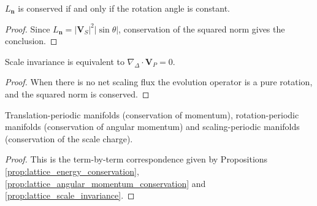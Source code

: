 \begin{proposition}\label{prop:lattice_angular_momentum_conservation}
$L_{\mathbf{n}}$ is conserved if and only if the rotation angle is constant.
\end{proposition}

\begin{proof}
Since $L_{\mathbf{n}}=|\mathbf{V}_S|^2|\sin\theta|$, conservation of the squared norm gives the conclusion.
\end{proof}

\begin{proposition}\label{prop:lattice_scale_invariance}
Scale invariance is equivalent to $\nabla_{\Delta}\cdot\mathbf{V}_P=0$.
\end{proposition}

\begin{proof}
When there is no net scaling flux the evolution operator is a pure rotation, and the squared norm is conserved.
\end{proof}

\begin{theorem}\label{thm:conservation_periodic_manifolds}
Translation-periodic manifolds (conservation of momentum), rotation-periodic manifolds (conservation of angular momentum) and scaling-periodic manifolds (conservation of the scale charge).
\end{theorem}

\begin{proof}
This is the term-by-term correspondence given by Propositions \ref{prop:lattice_energy_conservation}, \ref{prop:lattice_angular_momentum_conservation} and \ref{prop:lattice_scale_invariance}.
\end{proof}

